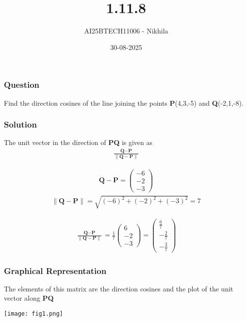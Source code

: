\documentclass{beamer}
\title{1.11.8 }
\author{AI25BTECH11006 - Nikhila}
\date{30-08-2025}
\begin{document}
\frame{\titlepage}

\begin{frame}
\frametitle{Question}
Find the direction cosines of the line joining the points \textbf{P}(4,3,-5) and \textbf{Q}(-2,1,-8).\\
 \end{frame}




\begin{frame}
\frametitle{Solution}
The unit vector in the direction of \textbf{PQ} is given as
 \begin{align*}
\frac{\textbf{Q}-\textbf{P}}{\lVert \textbf{Q}-\textbf{P} \rVert}
\end{align*}

\begin{align}
    \textbf{Q}-\textbf{P} = \begin{pmatrix}-6 \\ -2 \\ -3\end{pmatrix}
\end{align}
\begin{align}
    \lVert \textbf{Q}-\textbf{P} \rVert = \sqrt{(-6)^2 + (-2)^2 + (-3)^2} = 7
\end{align}

\begin{align}
  \frac{\textbf{Q}-\textbf{P}}{\lVert \textbf{Q}-\textbf{P} \rVert} = \frac{1}{7} \begin{pmatrix}6 \\ -2 \\ -3\end{pmatrix} = \begin{pmatrix}\frac{6}{7} \\ -\frac{2}{7} \\ -\frac{3}{7}\end{pmatrix}
\end{align}
 \end{frame}


\begin{frame}
\frametitle{Graphical Representation}
The elements of this matrix are the direction cosines and the plot of the unit vector along \textbf{PQ}

\begin{center}
\texttt{[image: fig1.png]}
\end{center}
\end{frame}
\end{document}
